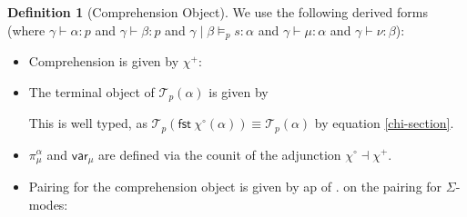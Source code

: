 \documentclass[10pt]{article}
\theoremstyle{definition}
\newtheorem{definition}{Definition}
\newcommand\dsd[1]{\ensuremath{\mathsf{#1}}}
\newcommand{\yields}{\vdash}
\newcommand\TermTwoT[5]{\ensuremath{#1 \mid #3 \vDash_{#5} #2 : #4}}
\newcommand\TrPlus[2]{\ensuremath{{#1}^+(#2)}}
\newcommand\TrCirc[2]{\ensuremath{{#1}^\circ(#2)}}
\newcommand\var[1]{\ensuremath{\mathsf{var}_{#1}}}
\newcommand\El[2]{\mathcal{T}_{#1}(#2)}
\newcommand\ApEl[2]{\mathcal{T}_{#1}\langle#2\rangle}
\newcommand\ap[2]{\ensuremath{#1 \langle #2 \rangle }}
\newcommand\ApPlus[2]{\ensuremath{{#1}^+ \langle #2 \rangle }}
\newcommand{\app}[2]{\ensuremath{#1 \: #2}}
\newcommand{\sigmacl}[3]{\ensuremath{\textnormal{$\Sigma$}\,#1{:}#2.\,#3}}
\newcommand{\fst}[1]{\app{\dsd{fst}}{#1}}
\newcommand{\snd}[1]{\app{\dsd{snd}}{#1}}
\newcommand\bdot[0]{\mathbin{.}}
\begin{document}
\begin{definition}[Comprehension Object]
\noindent We use the following derived forms
(where $\gamma \yields \alpha : p$ and $\gamma \yields \beta : p$ and  $\TermTwoT{\gamma}{s}{\beta}{\alpha}{p}$ and $\gamma \yields \mu : \alpha$ and $\gamma \yields \nu : \beta$):
  \begin{itemize}
  \item Comprehension is given by $\chi^+$:
  \item The terminal object of $\El{p}{\alpha}$ is given by 
  This is well typed, as $\El{p}{\fst{\TrCirc{\chi}{\alpha}}} \equiv \El{p}{\alpha}$ by equation \eqref{chi-section}.
  \item $\pi^\alpha_\mu$ and $\var{\mu}$ are defined via the counit of the adjunction $\chi^\circ \dashv \chi^+$.
  \item Pairing for the comprehension object is given by ap of
  $.$ on the pairing for $\Sigma$-modes:
  \end{itemize}
\end{definition}
\end{document}
